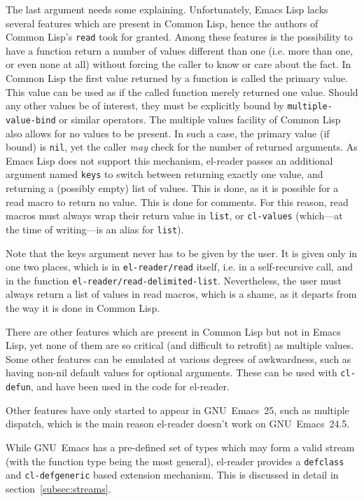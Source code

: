 \documentclass[a4paper,10pt,twoside]{report}
\newcommand{\el}{Emacs Lisp}
\newcommand{\cl}{Common Lisp}
\newcommand{\elr}{el-reader}
\newcommand{\sym}[1]{\texttt{#1}}
\newcommand{\fun}[1]{\texttt{#1}}
\newcommand{\emacs}{GNU~Emacs}
\newcommand{\emacsv}[1]{GNU~Emacs~#1}
\newcommand{\Read}{\fun{read}}
\begin{document}
The last argument needs some explaining.  Unfortunately, \el{} lacks several
features which are present in \cl{}, hence the authors of \cl{}’s \Read{} took
for granted.  Among these features is the possibility to have a function return
a number of values different than one (i.e. more than one, or even none at all)
without forcing the caller to know or care about the fact.  In \cl{} the first
value returned by a function is called the primary value.  This value can be
used as if the called function merely returned one value.  Should any other
values be of interest, they must be explicitly bound by
\sym{multiple-value-bind} or similar operators.\cite[Section 5.3 ``The Data and
Control Flow Dictionary'']{hyperspec} The multiple values facility of \cl{} also
allows for no values to be present.  In such a case, the primary value (if
bound) is \sym{nil}, yet the caller \emph{may} check for the number of returned
arguments.  As \el{} does not support this mechanism, \elr{} passes an
additional argument named \sym{keys} to switch between returning exactly one
value, and returning a (possibly empty) list of values.  This is done, as it is
possible for a read macro to return no value.  This is done for comments.  For
this reason, read macros must always wrap their return value in \fun{list}, or
\fun{cl-values} (which---at the time of writing---is an alias for \fun{list}).

Note that the keys argument never has to be given by the user.  It is given only
in one two places, which is in \fun{el-reader/read} itself, i.e. in a
self-recursive call, and in the function \fun{el-reader/read-delimited-list}.
Nevertheless, the user must always return a list of values in read macros, which
is a shame, as it departs from the way it is done in \cl{}.

There are other features which are present in \cl{} but not in \el{}, yet none
of them are so critical (and difficult to retrofit) as multiple values.  Some
other features can be emulated at various degrees of awkwardness, such as having
non-nil default values for optional arguments.  These can be used with
\fun{cl-defun}, and have been used in the code for \elr{}.

Other features have only started to appear in \emacsv{25}, such as multiple
dispatch, which is the main reason \elr{} doesn’t work on \emacsv{24.5}.

While \emacs{} has a pre-defined set of types which may form a valid stream
(with the function type being the most general), \elr{} provides a
\fun{defclass} and \fun{cl-defgeneric} based extension mechanism.  This is
discussed in detail in section~\ref{subsec:streams}.
\end{document}
